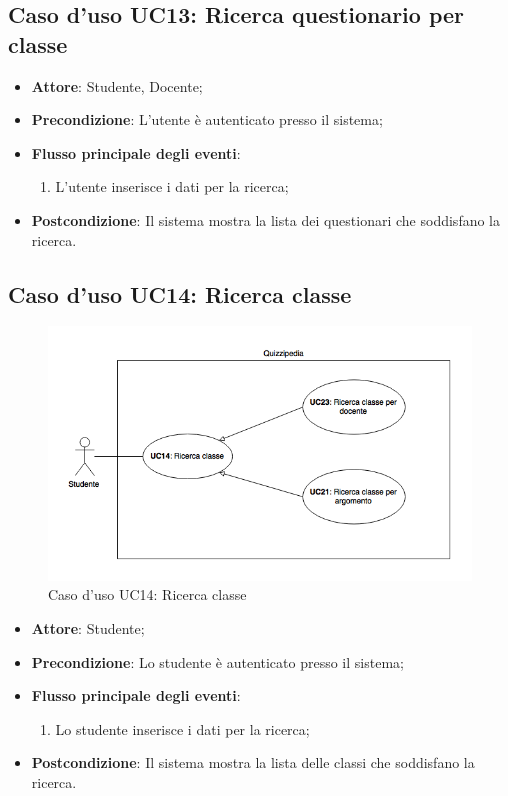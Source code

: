 \documentclass[12pt,a4paper]{article}
\begin{document}
\subsection{Caso d'uso UC13: Ricerca questionario per classe}

\begin{itemize}

\item \textbf{Attore}: Studente, Docente; 
\item \textbf{Precondizione}: L'utente è autenticato presso il sistema;

\item \textbf{Flusso principale degli eventi}:
\begin{enumerate}
	\item L'utente inserisce i dati per la ricerca;
	
\end{enumerate}
\item \textbf{Postcondizione}: Il sistema mostra la lista dei questionari che soddisfano la ricerca.
\end{itemize}
\hypertarget{UC14}{}
\subsection{Caso d'uso UC14: Ricerca classe}
\begin{figure}[H]
	\centering
	\includegraphics[width=\textwidth]{diagramUC14.png}
	\caption{Caso d'uso UC14: Ricerca classe}\label{fig:UC14} 
\end{figure}
\begin{itemize}

\item \textbf{Attore}: Studente; 
\item \textbf{Precondizione}: Lo studente è autenticato presso il sistema;

\item \textbf{Flusso principale degli eventi}:
\begin{enumerate}
	\item Lo studente inserisce i dati per la ricerca;
	
\end{enumerate}
\item \textbf{Postcondizione}: Il sistema mostra la lista delle classi che soddisfano la ricerca.
\end{itemize}
\hypertarget{UC15}{}
\end{document}

